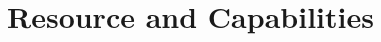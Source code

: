 \documentclass{beamer}
\begin{document}
        
        
        

\section{Resource and Capabilities}
\end{document}
